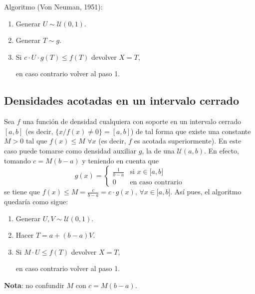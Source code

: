 \documentclass[
]{book}
\theoremstyle{break}
\theoremstyle{definition}
\theoremstyle{definition}
\theoremstyle{definition}
\theoremstyle{remark}
\let\BeginKnitrBlock\begin \let\EndKnitrBlock\end
\begin{document}
Algoritmo (Von Neuman, 1951):

\begin{enumerate}
\def\labelenumi{\arabic{enumi}.}
\item
  Generar \(U\sim \mathcal{U}\left( 0, 1\right)\).
\item
  Generar \(T\sim g\).
\item
  Si \(c\cdot U\cdot g\left( T\right) \leq f\left( T\right)\)
  devolver \(X=T\),

  en caso contrario volver al paso 1.
\end{enumerate}

\hypertarget{densidades-acotadas-en-un-intervalo-cerrado}{%
\subsection{Densidades acotadas en un intervalo cerrado}\label{densidades-acotadas-en-un-intervalo-cerrado}}

Sea \(f\) una función de
densidad cualquiera con soporte en un intervalo cerrado \([a,b]\) (es
decir, \(\{x/f\left( x\right) \neq0\}=[a,b]\)) de tal forma que
existe una constante \(M>0\) tal que \(f\left( x\right) \leq M\) \(\forall x\) (es decir,
\(f\) es acotada superiormente). En este caso puede tomarse como densidad
auxiliar \(g\), la de una \(\mathcal{U}(a,b)\). En efecto, tomando
\(c=M\left( b-a\right)\) y teniendo en cuenta que
\[g\left( x\right)  =\left\{
\begin{array}{ll}\frac{1}{b-a} & \text{si } x\in\lbrack a,b]\\
0 & \text{en caso contrario}
\end{array} \right.\]
se tiene que
\(f\left( x\right) \leq M = \frac{c}{b-a}=c\cdot g\left( x\right)\), \(\forall x\in\lbrack a,b]\). Así pues, el algoritmo quedaría
como sigue:

\begin{enumerate}
\def\labelenumi{\arabic{enumi}.}
\item
  Generar \(U,V\sim \mathcal{U}\left( 0, 1\right)\).
\item
  Hacer \(T = a + \left( b-a \right) V\).
\item
  Si \(M \cdot U\leq f\left( T \right)\)
  devolver \(X = T\),

  en caso contrario volver al paso 1.
\end{enumerate}

\textbf{Nota}: no confundir \(M\) con \(c = M \left( b - a \right)\).

\BeginKnitrBlock{exercise}
\protect\hypertarget{exr:unnamed-chunk-6}{}{\label{exr:unnamed-chunk-6} }
\EndKnitrBlock{exercise}
\end{document}
